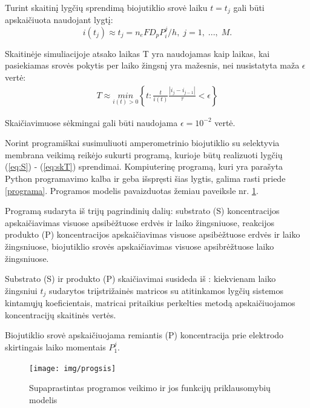 \documentclass[12pt, a4paper, lithuanian]{article}
\begin{document}
Turint skaitinį lygčių sprendimą biojutiklio srovė laiku $t = t_j$ gali būti
apskaičiuota naudojant lygtį:
\begin{equation} 
    \label{eq:i-form}
    i(t_j) \approx t_j = n_eFD_pP_i^j/h,\; j=1,\;...,\;M. 
\end{equation}

Skaitinėje simuliacijoje atsako laikas T yra naudojamas kaip laikas, kai pasiekiamas 
srovės pokytis per laiko žingsnį yra mažesnis, nei nusistatyta maža $\epsilon$
vertė:
\begin{equation} 
\begin{aligned}
    \label{eq:skT}
    T \approx \underset{i(t)>0}{min}\left\{t:\frac{t}{i(t)} \frac{\left| i_j -
            i_{j-1}
    \right|} {\tau} < \epsilon \right\}
\end{aligned}
\end{equation}

Skaičiavimuose sėkmingai gali būti naudojama $\epsilon = 10^{-2}$ vertė. 

Norint programiškai susimuliuoti amperometrinio biojutiklio su selektyvia
membrana veikimą reikėjo sukurti programą, kurioje būtų realizuoti lygčių
(\ref{eq:S}) - (\ref{eq:skT}) sprendimai. Kompiuterinę programą, kuri yra
parašyta Python programavimo kalba ir geba išspręsti šias
lygtis, galima rasti priede \ref{programa}. Programos modelis pavaizduotas
žemiau paveiksle nr.
\ref{img:progsis}.

Programą sudaryta iš trijų pagrindinių dalių: substrato (S) koncentracijos
apskaičiavimas visuose apsibėžtuose erdvės ir laiko žingsniuose, reakcijos
produkto (P) koncentracijos
apskaičiavimas visuose apsibėžtuose erdvės ir laiko žingsniuose, biojutiklio
srovės apskaičiavimas visuose apsibrėžtuose laiko žingsniuose.

Substrato (S) ir produkto (P) skaičiavimai susideda iš
: kiekvienam laiko žingsniui $t_j$  sudarytos triįstrižainės matricos su
atitinkamos lygčių sistemos kintamųjų koeficientais, matricai pritaikius
perkelties metodą apskaičiuojamos koncentracijų skaitinės vertės.

Biojutiklio srovė apskaičiuojama remiantis (P) koncentracija prie elektrodo
skirtingais laiko momentais $P^j_1$.
 \begin{figure}[H]
     \centering
     \texttt{[image: img/progsis]}
     \caption{Supaprastintas programos veikimo ir jos funkcijų priklausomybių
     modelis}
     \label{img:progsis}
 \end{figure}
\end{document}
